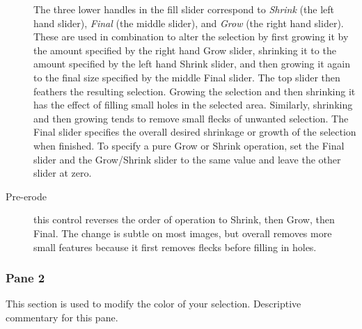 \begin{description}
    The three lower handles in the fill slider correspond to \textit{Shrink} (the left hand slider), \textit{Final} (the middle slider), and \textit{Grow} (the right hand slider). These are used in combination to alter the selection by first growing it by the amount specified by the right hand Grow slider, shrinking it to the amount specified by the left hand Shrink slider, and then growing it again to the final size specified by the middle Final slider. The top slider then feathers the resulting selection.
    Growing the selection and then shrinking it has the effect of filling small holes in the selected area. Similarly, shrinking and then growing tends to remove small flecks of unwanted selection. The Final slider specifies the overall desired shrinkage or growth of the selection when finished. To specify a pure Grow or Shrink operation, set the Final slider and the Grow/Shrink slider to the same value and leave the other slider at zero.
    \item[Pre-erode] this control reverses the order of operation to Shrink, then Grow, then Final. The change is subtle on most images, but overall removes more small features because it first removes flecks before filling in holes.
\end{description}

\subsubsection*{Pane 2}
\label{ssub:pane2}

This section is used to modify the color of your selection. Descriptive commentary for this pane.

